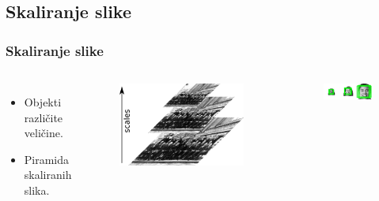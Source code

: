 \documentclass{beamer}
\begin{document}
\subsection{Skaliranje slike}
\begin{frame}
  \frametitle{Skaliranje slike}

  \begin{columns}[onlytextwidth,T]
    \begin{itemize}
    \item<1-> Objekti različite veličine.
    \item<1-> Piramida skaliranih slika.
    \end{itemize}

    \begin{figure}[H]
      \centering
      \includegraphics[width=1.0\linewidth]{../images/image_pyramid}
    \end{figure}

      \begin{figure}[H]
        \centering
        \includegraphics[width=1.0\linewidth]{../images/sixfaces_scaled_res}
      \end{figure}

  \end{columns}
\end{frame}
\end{document}
